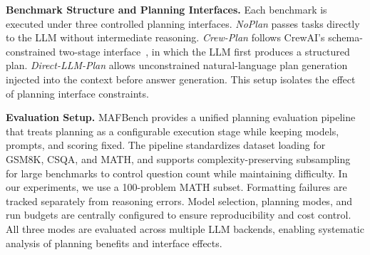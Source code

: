 \noindent\textbf{Benchmark Structure and Planning Interfaces.}
Each benchmark is executed under three controlled planning interfaces. \emph{NoPlan} passes tasks directly to the LLM without intermediate reasoning. \emph{Crew-Plan} follows CrewAI’s schema-constrained two-stage interface~\cite{crewai2025}, in which the LLM first produces a structured plan. \emph{Direct-LLM-Plan} allows unconstrained natural-language plan generation injected into the context before answer generation. This setup isolates the effect of planning interface constraints.

\noindent\textbf{Evaluation Setup.}
MAFBench provides a unified planning evaluation pipeline that treats planning as a configurable execution stage while keeping models, prompts, and scoring fixed. The pipeline standardizes dataset loading for GSM8K, CSQA, and MATH, and supports complexity-preserving subsampling for large benchmarks to control question count while maintaining difficulty. In our experiments, we use a 100-problem MATH subset. Formatting failures are tracked separately from reasoning errors. Model selection, planning modes, and run budgets are centrally configured to ensure reproducibility and cost control. All three modes are evaluated across multiple LLM backends, enabling systematic analysis of planning benefits and interface effects.








